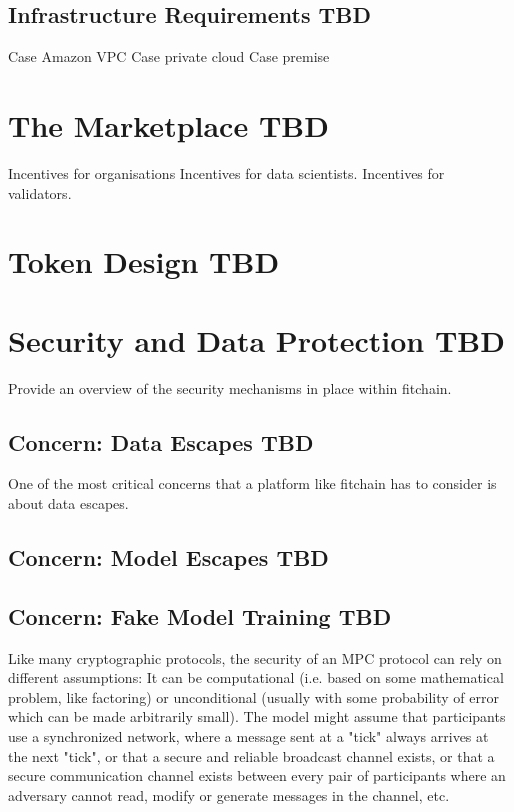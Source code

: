 \documentclass[12pt, a4paper,titlepage]{extreport}
\begin{document}
\subsection{Infrastructure Requirements TBD}
Case Amazon VPC
Case private cloud
Case premise 

\section{The Marketplace TBD}
Incentives for organisations 
Incentives for data scientists.
Incentives for validators. 



\section{Token Design TBD}

\section{Security and Data Protection TBD}
Provide an overview of the security mechanisms in place within fitchain.

\subsection{Concern: Data Escapes TBD}
One of the most critical concerns that a platform like fitchain has to consider is about data escapes.

\subsection{Concern: Model Escapes TBD}


\subsection{Concern: Fake Model Training TBD}


Like many cryptographic protocols, the security of an MPC protocol can rely on different assumptions:
It can be computational (i.e. based on some mathematical problem, like factoring) or unconditional (usually with some probability of error which can be made arbitrarily small).
The model might assume that participants use a synchronized network, where a message sent at a "tick" always arrives at the next "tick", or that a secure and reliable broadcast channel exists, or that a secure communication channel exists between every pair of participants where an adversary cannot read, modify or generate messages in the channel, etc.
\end{document}
